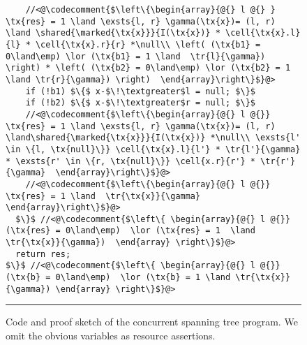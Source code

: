 \begin{figure}
\begin{lstlisting}
    //<@\codecomment{$\left\{\begin{array}{@{} l @{} } \tx{res} = 1 \land \exsts{l, r} \gamma(\tx{x})= (l, r) \land \shared{\marked{\tx{x}}}{I(\tx{x})} * \cell{\tx{x}.l}{l} * \cell{\tx{x}.r}{r} *\null\\ \left( (\tx{b1} = 0\land\emp) \lor (\tx{b1} = 1 \land  \tr{l}{\gamma}) \right) * \left( (\tx{b2} = 0\land\emp) \lor (\tx{b2} = 1 \land \tr{r}{\gamma}) \right)  \end{array}\right\}$}@>
    if (!b1) $\{$ x-$\!\textgreater$l = null; $\}$
    if (!b2) $\{$ x-$\!\textgreater$r = null; $\}$
    //<@\codecomment{$\left\{\begin{array}{@{} l @{}}  \tx{res} = 1 \land \exsts{l, r} \gamma(\tx{x})= (l, r) \land\shared{\marked{\tx{x}}}{I(\tx{x})} *\null\\ \exsts{l' \in \{l, \tx{null}\}} \cell{\tx{x}.l}{l'} * \tr{l'}{\gamma} * \exsts{r' \in \{r, \tx{null}\}} \cell{x.r}{r'} * \tr{r'}{\gamma}  \end{array}\right\}$}@>
    //<@\codecomment{$\left\{\begin{array}{@{} l @{}} \tx{res} = 1 \land  \tr{\tx{x}}{\gamma}    \end{array}\right\}$}@>
  $\}$ //<@\codecomment{$\left\{ \begin{array}{@{} l @{}} (\tx{res} = 0\land\emp)  \lor (\tx{res} = 1  \land \tr{\tx{x}}{\gamma})  \end{array} \right\}$}@>
  return res;
$\}$ //<@\codecomment{$\left\{ \begin{array}{@{} l @{}} (\tx{b} = 0\land\emp)  \lor (\tx{b} = 1 \land \tr{\tx{x}}{\gamma}) \end{array} \right\}$}@>
\end{lstlisting}
\hrule\vspace*{-6pt}
\caption{Code and proof sketch of the concurrent spanning tree
  program. We omit the obvious variables as resource assertions.}
\label{fig:conSpanningTree}
\end{figure}

